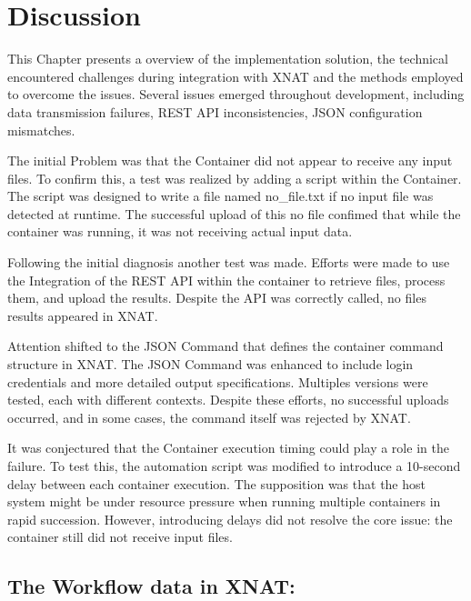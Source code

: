 \chapter{Discussion}
This Chapter presents a overview of the implementation solution, the technical encountered challenges during integration with XNAT and the methods employed to overcome the issues. Several issues emerged throughout development, including data transmission failures, REST API inconsistencies, JSON configuration mismatches.

The initial Problem was that the Container did not appear to receive any input files. To confirm this, a test was realized by adding a script within the Container. The script was designed to write a file named no\_file.txt if no input file was detected at runtime. The successful upload of this no file confimed that while the container was running, it was not receiving actual input data.

Following the initial diagnosis another test was made. Efforts were made to use the Integration of the REST API within the container to retrieve files, process them, and upload the results.
Despite the API was correctly called, no files results appeared in XNAT. 

Attention shifted to the JSON Command that defines the container command structure in XNAT. The JSON Command was enhanced to include login credentials and more detailed output specifications. Multiples versions were tested, each with different contexts. Despite these efforts, no successful uploads occurred, and in some cases, the command itself was rejected by XNAT. 

It was conjectured that the Container execution timing could play a role in the failure. To test this, the automation script was modified to introduce a 10-second delay between each container execution. The supposition was that the host system might be under resource pressure when running multiple containers in rapid succession. However, introducing delays did not resolve the core issue: the container still did not receive input files.

\section{The Workflow data in XNAT:}

